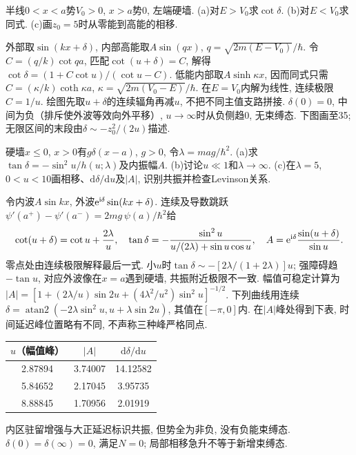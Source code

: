 \begin{exercise}
半线$0<x<a$势$V_0>0$, $x>a$势0, 左端硬墙. (a)对$E>V_0$求$\cot\delta$. (b)对$E<V_0$求同式. (c)画$z_0=5$时从零能到高能的相移.
\end{exercise}
\begin{solution}
外部取$\sin(kx+\delta)$, 内部高能取$A\sin(qx)$, $q=\sqrt{2m(E-V_0)}/\hbar$. 令$C=(q/k)\cot qa$, 匹配$\cot(u+\delta)=C$, 解得$\cot\delta=(1+C\cot u)/(\cot u-C)$. 低能内部取$A\sinh\kappa x$, 因而同式只需$C=(\kappa/k)\coth\kappa a$, $\kappa=\sqrt{2m(V_0-E)}/\hbar$. 在$E=V_0$内解为线性, 连续极限$C=1/u$. 绘图先取$u+\delta$的连续辐角再减$u$, 不把不同主值支路拼接. $\delta(0)=0$, 中间为负（排斥使外波等效向外平移）, $u\to\infty$时从负侧趋0, 无束缚态. 下图画至35; 无限区间的末段由$\delta\sim-z_0^2/(2u)$描述.

\end{solution}
\begin{exercise}
硬墙$x\leq0$, $x>0$有$g\delta(x-a)$, $g>0$, 令$\lambda=mag/\hbar^2$. (a)求$\tan\delta=-\sin^2u/h(u;\lambda)$及内振幅$A$. (b)讨论$u\ll1$和$\lambda\to\infty$. (c)在$\lambda=5$, $0<u<10$画相移、$\mathrm d\delta/\mathrm du$及$|A|$, 识别共振并检查Levinson关系.
\end{exercise}
\begin{solution}
令内波$A\sin kx$, 外波$\mathrm e^{\mathrm i\delta}\sin(kx+\delta)$. 连续及导数跳跃$\psi\prime(a^+)-\psi\prime(a^-)=2mg\,\psi(a)/\hbar^2$给
\[
\cot(u+\delta)=\cot u+\frac{2\lambda}{u},\quad
\tan\delta=-\frac{\sin^2u}{u/(2\lambda)+\sin u\cos u},\quad
A=\mathrm e^{\mathrm i\delta}\frac{\sin(u+\delta)}{\sin u}.
\]
零点处由连续极限解释最后一式. 小$u$时$\tan\delta\sim-[2\lambda/(1+2\lambda)]u$; 强障碍趋$-\tan u$, 对应外波像在$x=a$遇到硬墙, 共振附近极限不一致. 幅值可稳定计算为$|A|=[1+(2\lambda/u)\sin2u+(4\lambda^2/u^2)\sin^2u]^{-1/2}$. 下列曲线用连续$\delta=\operatorname{atan2}(-2\lambda\sin^2u,u+\lambda\sin2u)$, 其值在$[-\pi,0]$内. 在$|A|$峰处得到下表, 时间延迟峰位置略有不同, 不声称三种峰严格同点.
\begin{center}\begin{tabular}{ccc}\toprule $u$（幅值峰）&$|A|$&$\mathrm d\delta/\mathrm du$\\\midrule
2.87894&3.74007&14.12582\\5.84652&2.17045&3.95735\\8.88845&1.70956&2.01919\\\bottomrule\end{tabular}\end{center}



内区驻留增强与大正延迟标识共振, 但势全为非负, 没有负能束缚态. $\delta(0)=\delta(\infty)=0$, 满足$N=0$; 局部相移急升不等于新增束缚态.
\end{solution}
